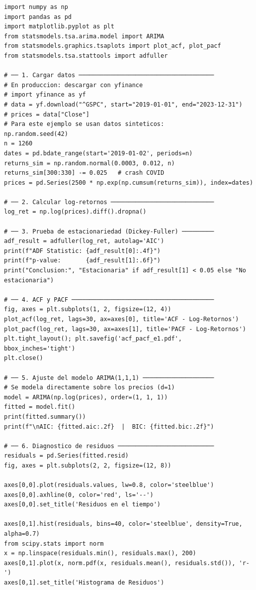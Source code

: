 \documentclass[12pt, a4paper]{article}
\begin{document}
\begin{lstlisting}[caption={Ejemplo 1: ARIMA(1,1,1) sobre precios S\&P 500},
                   label={lst:e1}]
import numpy as np
import pandas as pd
import matplotlib.pyplot as plt
from statsmodels.tsa.arima.model import ARIMA
from statsmodels.graphics.tsaplots import plot_acf, plot_pacf
from statsmodels.tsa.stattools import adfuller

# ── 1. Cargar datos ──────────────────────────────────────
# En produccion: descargar con yfinance
# import yfinance as yf
# data = yf.download("^GSPC", start="2019-01-01", end="2023-12-31")
# prices = data["Close"]
# Para este ejemplo se usan datos sinteticos:
np.random.seed(42)
n = 1260
dates = pd.bdate_range(start='2019-01-02', periods=n)
returns_sim = np.random.normal(0.0003, 0.012, n)
returns_sim[300:330] -= 0.025   # crash COVID
prices = pd.Series(2500 * np.exp(np.cumsum(returns_sim)), index=dates)

# ── 2. Calcular log-retornos ─────────────────────────────
log_ret = np.log(prices).diff().dropna()

# ── 3. Prueba de estacionariedad (Dickey-Fuller) ─────────
adf_result = adfuller(log_ret, autolag='AIC')
print(f"ADF Statistic: {adf_result[0]:.4f}")
print(f"p-value:       {adf_result[1]:.6f}")
print("Conclusion:", "Estacionaria" if adf_result[1] < 0.05 else "No estacionaria")

# ── 4. ACF y PACF ────────────────────────────────────────
fig, axes = plt.subplots(1, 2, figsize=(12, 4))
plot_acf(log_ret, lags=30, ax=axes[0], title='ACF - Log-Retornos')
plot_pacf(log_ret, lags=30, ax=axes[1], title='PACF - Log-Retornos')
plt.tight_layout(); plt.savefig('acf_pacf_e1.pdf', bbox_inches='tight')
plt.close()

# ── 5. Ajuste del modelo ARIMA(1,1,1) ────────────────────
# Se modela directamente sobre los precios (d=1)
model = ARIMA(np.log(prices), order=(1, 1, 1))
fitted = model.fit()
print(fitted.summary())
print(f"\nAIC: {fitted.aic:.2f}  |  BIC: {fitted.bic:.2f}")

# ── 6. Diagnostico de residuos ───────────────────────────
residuals = pd.Series(fitted.resid)
fig, axes = plt.subplots(2, 2, figsize=(12, 8))

axes[0,0].plot(residuals.values, lw=0.8, color='steelblue')
axes[0,0].axhline(0, color='red', ls='--')
axes[0,0].set_title('Residuos en el tiempo')

axes[0,1].hist(residuals, bins=40, color='steelblue', density=True, alpha=0.7)
from scipy.stats import norm
x = np.linspace(residuals.min(), residuals.max(), 200)
axes[0,1].plot(x, norm.pdf(x, residuals.mean(), residuals.std()), 'r-')
axes[0,1].set_title('Histograma de Residuos')


\end{lstlisting}
\end{document}
